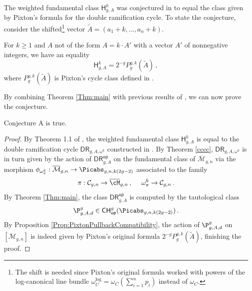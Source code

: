 The weighted fundamental class
$\mathsf{H}^k_{g,A}$
was conjectured in \cite{Farkas2016The-moduli-spac,Schmitt2016Dimension-theor}
to equal  the class given by Pixton's formula for the double ramification cycle. To state the conjecture, consider the shifted\footnote{The shift is needed since Pixton's original formula worked with powers of the log-canonical line bundle $\omega_C^{\text{log}} = \omega_C(\sum_{i=1}^n p_i)$ instead of $\omega_C$.} vector $\widetilde A = (a_1 + k, \ldots, a_n +k)$.

\begin{conjectureA}
For $k \geq 1$ and $A$ not of the form $A = k \cdot A'$ with a vector $A'$ of nonnegative integers, we have an equality
\[\mathsf{H}^k_{g,A} = 2^{-g} P_g^{g,k}(\widetilde A)\, ,\]
where $P_g^{g,k}(\widetilde A)$ is Pixton's cycle class defined in \cite[Section 1.1]{Janda2016Double-ramifica}.
\end{conjectureA}

 By combining Theorem \ref{Thm:main}  with previous results of \cite{Holmes2019Infinitesimal-s}, we can now prove the conjecture.

\begin{theorem}
\notready\label{FPA}
Conjecture A is true.
\end{theorem}
\begin{proof}
By Theorem 1.1 of \cite{Holmes2019Infinitesimal-s}, the weighted fundamental class $\mathsf{H}^k_{g,A}$ is equal to the double ramification cycle $\mathsf{DR}_{g,A, \omega^k}$ constructed in \cite{Holmes2017Extending-the-d}. By Theorem \ref{cccc},
$\mathsf{DR}_{g,A, \omega^k}$
is in turn given by the action of $\mathsf{DR}^{\mathsf{op}}_{g,A}$ on the fundamental class
of $\overline{\mathcal{M}}_{g,n}$ via the morphism $\phi_{\omega_\pi^k}: \overline{\mathcal{M}}_{g,n} \to \Picabs_{g,n,k(2g-2)}$ associated to the family
\begin{equation*}
\pi: \mathcal{C}_{g,n} \rightarrow \overline{\cM}_{g,n}\, , \ \ \ \ \omega_\pi^{k} \rightarrow \mathcal{C}_{g,n}\, .
\end{equation*}
By Theorem \ref{Thm:main}, the class $\mathsf{DR}^{\mathsf{op}}_{g,A}$ is computed by the tautological class
$$\P_{g,A,d}^g \in {\mathsf{CH}}^g_{\mathsf{op}}(\Picabs_{g,n,k(2g-2)})\, . $$ By Proposition \ref{Prop:PixtonPullbackCompatibility}, the action of $\P_{g,A,d}^g$ on $[\overline{\mathcal{M}}_{g,n}]$ is indeed given by Pixton's original formula $ 2^{-g} P_g^{g,k}(\widetilde A)$, finishing the proof. \end{proof}

